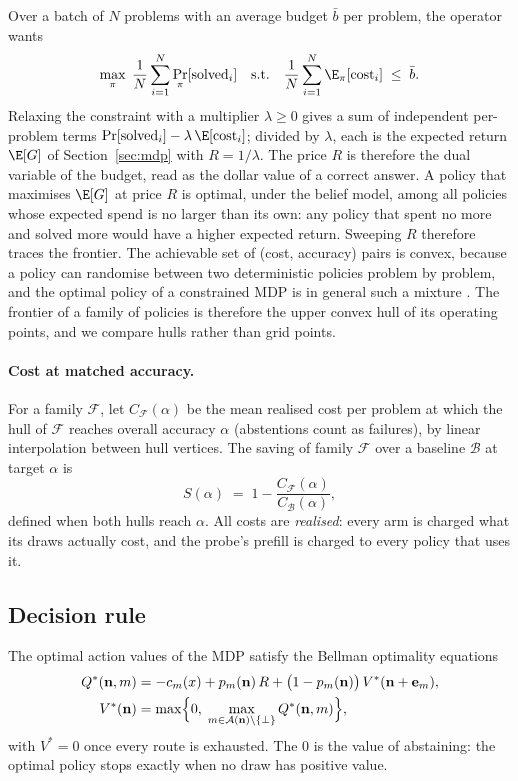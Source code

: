 \documentclass[10pt]{article} %
\newcommand{\abst}{\bot}
\begin{document}
Over a batch of $N$ problems with an average budget $\bar b$ per problem, the operator wants
\[
\max_{\pi}\;\frac1N\sum_{i=1}^N \Pr_\pi[\text{solved}_i]
\quad\text{s.t.}\quad
\frac1N\sum_{i=1}^N \E_\pi[\text{cost}_i]\;\le\;\bar b .
\]
Relaxing the constraint with a multiplier $\lambda\ge0$ gives a sum of independent per-problem
terms $\Pr[\text{solved}_i]-\lambda\,\E[\text{cost}_i]$; divided by $\lambda$, each is the
expected return $\E[G]$ of Section~\ref{sec:mdp} with $R=1/\lambda$.  The price $R$ is therefore
the dual variable of the budget, read as the dollar value of a correct answer.  A policy that
maximises $\E[G]$ at price $R$ is optimal, under the belief model, among all policies whose
expected spend is no larger than its own: any policy that spent no more and solved more would
have a higher expected return.  Sweeping $R$ therefore traces the frontier.  The achievable set
of (cost, accuracy) pairs is convex, because a policy can randomise between two deterministic
policies problem by problem, and the optimal policy of a constrained MDP is in general such a
mixture \citep{altman1999constrained}.  The frontier of a family of policies is therefore the
upper convex hull of its operating points, and we compare hulls rather than grid points.

\paragraph{Cost at matched accuracy.}
For a family $\mathcal F$, let $C_{\mathcal F}(\alpha)$ be the mean realised cost per problem at
which the hull of $\mathcal F$ reaches overall accuracy $\alpha$ (abstentions count as
failures), by linear interpolation between hull vertices.  The saving of family $\mathcal F$ over
a baseline $\mathcal B$ at target $\alpha$ is
\[
S(\alpha)\;=\;1-\frac{C_{\mathcal F}(\alpha)}{C_{\mathcal B}(\alpha)} ,
\]
defined when both hulls reach $\alpha$.  All costs are \emph{realised}: every arm is charged
what its draws actually cost, and the probe's prefill is charged to every policy that uses it.

\subsection{Decision rule}
\label{sec:rule}

The optimal action values of the MDP satisfy the Bellman optimality equations
\citep{puterman1994markov,sutton2018reinforcement}
\begin{align*}
Q^*(\mathbf n,m) &= -c_m(x)+p_m(\mathbf n)\,R+\bigl(1-p_m(\mathbf n)\bigr)\,V^*(\mathbf n+\mathbf e_m),\\
V^*(\mathbf n) &= \max\Bigl\{0,\;\max_{m\in\mathcal A(\mathbf n)\setminus\{\abst\}} Q^*(\mathbf n,m)\Bigr\},
\end{align*}
with $V^*=0$ once every route is exhausted.  The $0$ is the value of abstaining: the optimal
policy stops exactly when no draw has positive value.
\end{document}
